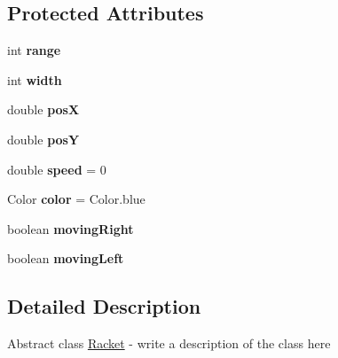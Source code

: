 \subsection*{Protected Attributes}
\begin{DoxyCompactItemize}
\item 
\hypertarget{classbrick_breaker_1_1_racket_a14604c7182eb6f3ed8285a0b88fbf26f}{
int {\bfseries range}}
\label{classbrick_breaker_1_1_racket_a14604c7182eb6f3ed8285a0b88fbf26f}

\item 
\hypertarget{classbrick_breaker_1_1_racket_abb3c0be790adfb946af95d700e9498e3}{
int {\bfseries width}}
\label{classbrick_breaker_1_1_racket_abb3c0be790adfb946af95d700e9498e3}

\item 
\hypertarget{classbrick_breaker_1_1_racket_aa9e386519155ef9bc1675f04c25dfc11}{
double {\bfseries posX}}
\label{classbrick_breaker_1_1_racket_aa9e386519155ef9bc1675f04c25dfc11}

\item 
\hypertarget{classbrick_breaker_1_1_racket_a087c2386f299c432c5ad4c6c6c274f81}{
double {\bfseries posY}}
\label{classbrick_breaker_1_1_racket_a087c2386f299c432c5ad4c6c6c274f81}

\item 
\hypertarget{classbrick_breaker_1_1_racket_ab8a7a0111d64fe89d58b2f375d701047}{
double {\bfseries speed} = 0}
\label{classbrick_breaker_1_1_racket_ab8a7a0111d64fe89d58b2f375d701047}

\item 
\hypertarget{classbrick_breaker_1_1_racket_a5fcccad4ce0ba0cfa26ae2cf1501a601}{
Color {\bfseries color} = Color.blue}
\label{classbrick_breaker_1_1_racket_a5fcccad4ce0ba0cfa26ae2cf1501a601}

\item 
\hypertarget{classbrick_breaker_1_1_racket_a0749ef4c81abf63c8ee1d012ffd90155}{
boolean {\bfseries movingRight}}
\label{classbrick_breaker_1_1_racket_a0749ef4c81abf63c8ee1d012ffd90155}

\item 
\hypertarget{classbrick_breaker_1_1_racket_a88667ee5bc44b240cac5817ffb088a52}{
boolean {\bfseries movingLeft}}
\label{classbrick_breaker_1_1_racket_a88667ee5bc44b240cac5817ffb088a52}

\end{DoxyCompactItemize}


\subsection{Detailed Description}
Abstract class \hyperlink{classbrick_breaker_1_1_racket}{Racket} -\/ write a description of the class here

